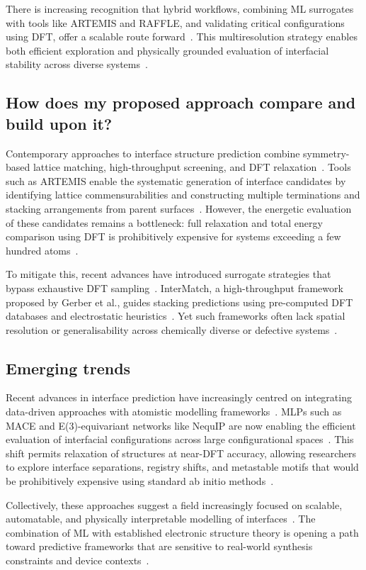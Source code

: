 \newpage There is increasing recognition that hybrid workflows, combining ML surrogates with tools like ARTEMIS and RAFFLE, and validating critical configurations using DFT, offer a scalable route forward~\nocite{}.
This multiresolution strategy enables both efficient exploration and physically grounded evaluation of interfacial stability across diverse systems~\cite{artemis_paper, raffle_paper}.

\subsection*{How does my proposed approach compare and build upon it?}

Contemporary approaches to interface structure prediction combine symmetry-based lattice matching, high-throughput screening, and DFT relaxation~\nocite{}.
Tools such as ARTEMIS enable the systematic generation of interface candidates by identifying lattice commensurabilities and constructing multiple terminations and stacking arrangements from parent surfaces~\cite{Taylor2020-nl}.
However, the energetic evaluation of these candidates remains a bottleneck: full relaxation and total energy comparison using DFT is prohibitively expensive for systems exceeding a few hundred atoms~\nocite{}.

To mitigate this, recent advances have introduced surrogate strategies that bypass exhaustive DFT sampling~\nocite{}.
InterMatch, a high-throughput framework proposed by Gerber et al., guides stacking predictions using pre-computed DFT databases and electrostatic heuristics~\cite{Gerber2023-yd}.
Yet such frameworks often lack spatial resolution or generalisability across chemically diverse or defective systems~\cite{Gerber2023-yd, Khot2025-hh}.

\subsection*{Emerging trends}

Recent advances in interface prediction have increasingly centred on integrating data-driven approaches with atomistic modelling frameworks~\nocite{}.
MLPs such as MACE and E(3)-equivariant networks like NequIP are now enabling the efficient evaluation of interfacial configurations across large configurational spaces~\nocite{}.
This shift permits relaxation of structures at near-DFT accuracy, allowing researchers to explore interface separations, registry shifts, and metastable motifs that would be prohibitively expensive using standard ab initio methods~\cite{Batatia2022-xz, Batzner2022-fd, Owen2024-wp}.

Collectively, these approaches suggest a field increasingly focused on scalable, automatable, and physically interpretable modelling of interfaces~\nocite{}.
The combination of ML with established electronic structure theory is opening a path toward predictive frameworks that are sensitive to real-world synthesis constraints and device contexts~\nocite{}.
